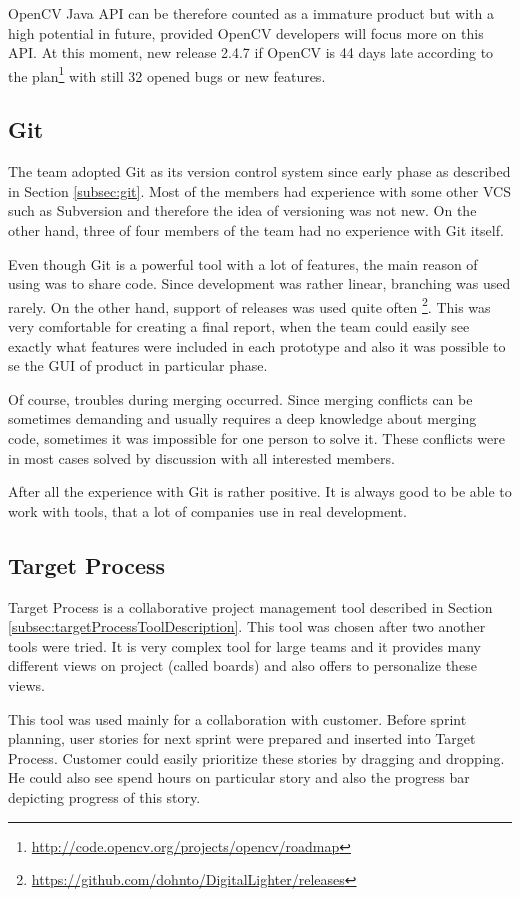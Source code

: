 OpenCV Java API can be therefore counted as a immature product but with a high potential in future, provided OpenCV developers will focus more on this API.
At this moment, new release 2.4.7 if OpenCV is 44 days late according to the plan\footnote{\url{http://code.opencv.org/projects/opencv/roadmap}} with still 32 opened bugs or new features.

\subsection{Git}
The team adopted Git as its version control system since early phase as described in Section \ref{subsec:git}.
Most of the members had experience with some other VCS such as Subversion and therefore the idea of versioning was not new.
On the other hand, three of four members of the team had no experience with Git itself.

Even though Git is a powerful tool with a lot of features, the main reason of using was to share code.
Since development was rather linear, branching was used rarely.
On the other hand, support of releases was used quite often \footnote{\url{https://github.com/dohnto/DigitalLighter/releases}}.
This was very comfortable for creating a final report, when the team could easily see exactly what features were included in each prototype and also it was possible to se the GUI of product in particular phase.

Of course, troubles during merging occurred.
Since merging conflicts can be sometimes demanding and usually requires a deep knowledge about merging code, sometimes it was impossible for one person to solve it.
These conflicts were in most cases solved by discussion with all interested members.

After all the experience with Git is rather positive. 
It is always good to be able to work with tools, that a lot of companies use in real development.


\subsection{Target Process}
Target Process is a collaborative project management tool described in Section \ref{subsec:targetProcessToolDescription}.
This tool was chosen after two another tools were tried.
It is very complex tool for large teams and it provides many different views on project (called boards) and also offers to personalize these views.

This tool was used mainly for a collaboration with customer. 
Before sprint planning, user stories for next sprint were prepared and inserted into Target Process.
Customer could easily prioritize these stories by dragging and dropping.
He could also see spend hours on particular story and also the progress bar depicting progress of this story.

